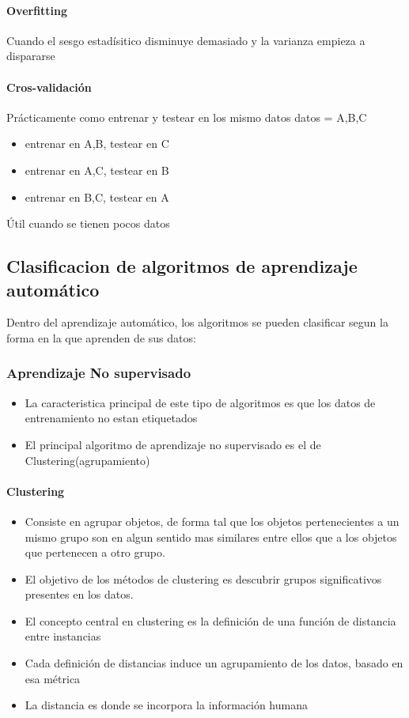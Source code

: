 \documentclass[a4paper,10pt]{article}
\begin{document}
\paragraph {Overfitting}
Cuando el sesgo estadísitico disminuye demasiado y la varianza empieza a dispararse

\paragraph {Cros-validación}
Prácticamente como entrenar y testear en los mismo datos
datos = {A,B,C}
\begin{itemize}
\item entrenar en A,B, testear en C
\item entrenar en A,C, testear en B
\item entrenar en B,C, testear en A
\end{itemize}
Útil cuando se tienen pocos datos

\subsection{Clasificacion de algoritmos de aprendizaje automático}
Dentro del aprendizaje automático, los algoritmos se pueden clasificar segun la forma en la que aprenden de sus datos:

\subsubsection{Aprendizaje No supervisado} 
\begin{itemize}
  \item La caracteristica principal de este tipo de algoritmos es que los datos de entrenamiento no estan etiquetados
  \item El principal algoritmo de aprendizaje no supervisado es el de Clustering(agrupamiento)
\end{itemize}
\paragraph {Clustering}
\begin{itemize}
  \item Consiste en agrupar objetos, de forma tal que los objetos pertenecientes a un mismo grupo son en algun sentido mas similares entre ellos que a los objetos que pertenecen a otro grupo.
  \item El objetivo de los métodos de clustering es descubrir grupos significativos presentes en los datos.
  \item El concepto central en clustering es la definición de una función de distancia entre instancias
  \item Cada definición de distancias induce un agrupamiento de los datos, basado en esa métrica
  \item La distancia es donde se incorpora la información humana
\end{itemize}
\end{document}
